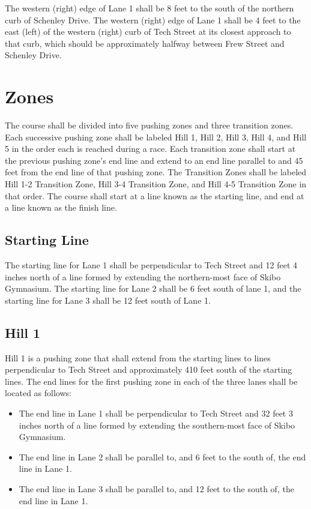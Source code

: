 	The western (right) edge of Lane 1 shall be 8 feet to the south of the northern
	curb of Schenley Drive. The western (right) edge of Lane 1 shall be 4 feet to
	the east (left) of the western (right) curb of Tech Street at its closest
	approach to that curb, which should be approximately halfway between Frew
	Street and Schenley Drive.

\section{Zones}

	The course shall be divided into five pushing zones and three transition zones. 
	Each successive pushing zone shall be labeled Hill 1, Hill 2, Hill 3, Hill 4, and 
	Hill 5 in the order each is reached during a race. Each transition zone shall 
	start at the previous pushing zone's end line and extend to an end line parallel to and 
	45 feet from the end line of that pushing zone. The Transition Zones 
	shall be labeled Hill 1-2 Transition Zone, Hill 3-4 Transition Zone, and 
	Hill 4-5 Transition Zone in that order. The course shall start at a line known as 
	the starting line, and end at a line known as the finish line.

\subsection{Starting Line}

	The starting line for Lane 1 shall be perpendicular to Tech Street and 12 feet
	4 inches north of a line formed by extending the northern-most face of Skibo
	Gymnasium. The starting line for Lane 2 shall be 6 feet south of lane 1, and
	the starting line for Lane 3 shall be 12 feet south of Lane 1.

\subsection{Hill 1}

	Hill 1 is a pushing zone that shall extend from the starting lines to lines 
	perpendicular to Tech Street and approximately 410 feet south of the starting lines. 
	The end lines for the first pushing zone in each of the three lanes shall be located 
	as follows:

	\begin{itemize}
	
		\item
		The end line in Lane 1 shall be perpendicular to Tech Street and 32 feet 3
		inches north of a line formed by extending the southern-most face of Skibo
		Gymnasium.

		\item
		The end line in Lane 2 shall be parallel to, and 6 feet to the south of, the
		end line in Lane 1.
		
		\item
		The end line in Lane 3 shall be parallel to, and 12 feet to the south of, the
		end line in Lane 1.

	\end{itemize}

